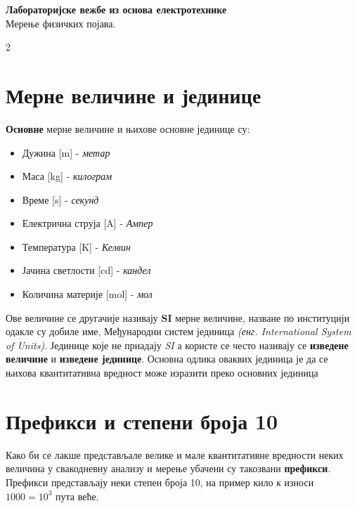 \documentclass[10pt]{article}
\begin{document}
\begin{center}
    {\LARGE\bfseries Лабораторијске вежбе из основа електротехнике} \\
    {\Large Мерење физичких појава.} \\
\end{center}
\vspace{6pt}

\begin{multicols}{2}

\section{Мерне величине и јединице}



\textbf{Основне} мерне величине и њихове основне јединице су: 

\begin{itemize}
  \item Дужина [m] - \textit{метар}
  \item Маса [kg] - \textit{килограм}
  \item Време [s] - \textit{секунд}
  \item Електрична струја [A] - \textit{Ампер}
  \item Температура [K] - \textit{Келвин}
  \item Јачина светлости [cd] - \textit{кандел}
  \item Количина материје [mol] - \textit{мол}
\end{itemize}

Ове величине се другачије називају \textbf{SI} мерне величине, назване по институцији одакле су добиле име, Међународни 
систем јединица \textit{(енг. International System of Units)}. Јединице које не приадају \textit{SI} а користе се
често називају се \textbf{изведене величине} и \textbf{изведене јединице}. Основна одлика оваквих јединица је да се њихова квантитативна вредност
може изразити преко основних јединица

\section{Префикси и степени броја 10}

Како би се лакше представљале велике и мале квантитативне вредности неких
величина у свакодневну анализу и мерење убачени су такозвани \textbf{префикси}.
Префикси представљају неки степен броја 10, на пример кило \textit{к} износи $1000 = 10^3$
пута веће.

\end{multicols}
\end{document}

